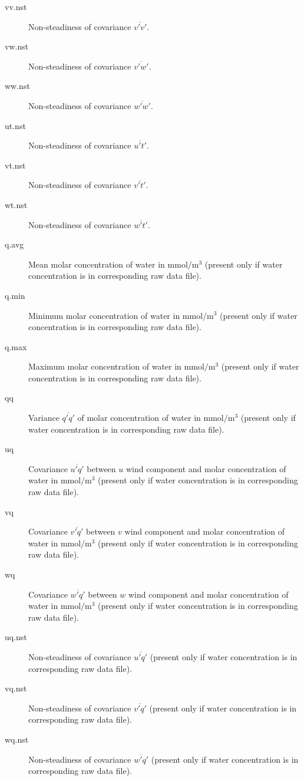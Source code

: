 \documentclass[a4paper,10pt]{book}
\begin{document}
\begin{description}
 \item[vv.nst] Non-steadiness of covariance $\overline{v'v'}$.
 \item[vw.nst] Non-steadiness of covariance $\overline{v'w'}$.
 \item[ww.nst] Non-steadiness of covariance $\overline{w'w'}$.
 \item[ut.nst] Non-steadiness of covariance $\overline{u't'}$.
 \item[vt.nst] Non-steadiness of covariance $\overline{v't'}$.
 \item[wt.nst] Non-steadiness of covariance $\overline{w't'}$.
 \item[q.avg] Mean molar concentration of water in $\mbox{mmol}/\mbox{m}^{3}$ (present only if water concentration is in corresponding raw data file).
 \item[q.min] Minimum molar concentration of water in $\mbox{mmol}/\mbox{m}^{3}$ (present only if water concentration is in corresponding raw data file).
 \item[q.max] Maximum molar concentration of water in $\mbox{mmol}/\mbox{m}^{3}$ (present only if water concentration is in corresponding raw data file).
 \item[qq] Variance $\overline{q'q'}$ of molar concentration of water in $\mbox{mmol}/\mbox{m}^{3}$ (present only if water concentration is in corresponding raw data file).
 \item[uq] Covariance $\overline{u'q'}$ between $u$ wind component and molar concentration of water in $\mbox{mmol}/\mbox{m}^{3}$ (present only if water concentration is in corresponding raw data file).
 \item[vq] Covariance $\overline{v'q'}$ between $v$ wind component and molar concentration of water in $\mbox{mmol}/\mbox{m}^{3}$ (present only if water concentration is in corresponding raw data file).
 \item[wq] Covariance $\overline{w'q'}$ between $w$ wind component and molar concentration of water in $\mbox{mmol}/\mbox{m}^{3}$ (present only if water concentration is in corresponding raw data file).
 \item[uq.nst] Non-steadiness of covariance $\overline{u'q'}$ (present only if water concentration is in corresponding raw data file).
 \item[vq.nst] Non-steadiness of covariance $\overline{v'q'}$ (present only if water concentration is in corresponding raw data file).
 \item[wq.nst] Non-steadiness of covariance $\overline{w'q'}$ (present only if water concentration is in corresponding raw data file).

\end{description}
\end{document}
